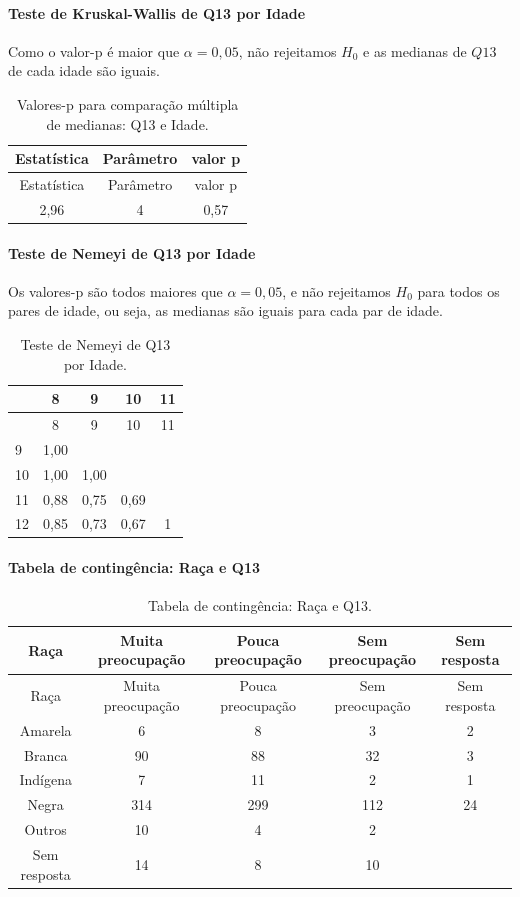 \documentclass[]{article}
\let\oldparagraph\paragraph
\renewcommand{\paragraph}[1]{\oldparagraph{#1}\mbox{}}
\begin{document}
\hypertarget{teste-de-kruskal-wallis-de-q13-por-idade}{%
\paragraph{Teste de Kruskal-Wallis de Q13 por Idade}\label{teste-de-kruskal-wallis-de-q13-por-idade}}

Como o valor-p é maior que \(\alpha=0,05\), não rejeitamos \(H_0\) e as medianas de \(Q13\) de cada idade são iguais.

\begin{longtable}[]{@{}ccc@{}}
\caption{\label{tab:unnamed-chunk-74}Valores-p para comparação múltipla de medianas: Q13 e Idade.}\tabularnewline
\toprule
Estatística & Parâmetro & valor p\tabularnewline
\midrule
\endfirsthead
\toprule
Estatística & Parâmetro & valor p\tabularnewline
\midrule
\endhead
2,96 & 4 & 0,57\tabularnewline
\bottomrule
\end{longtable}

\hypertarget{teste-de-nemeyi-de-q13-por-idade}{%
\paragraph{Teste de Nemeyi de Q13 por Idade}\label{teste-de-nemeyi-de-q13-por-idade}}

Os valores-p são todos maiores que \(\alpha=0,05\), e não rejeitamos \(H_0\) para todos os pares de idade, ou seja, as medianas são iguais para cada par de idade.

\begin{longtable}[]{@{}lcccc@{}}
\caption{\label{tab:unnamed-chunk-75}Teste de Nemeyi de Q13 por Idade.}\tabularnewline
\toprule
& 8 & 9 & 10 & 11\tabularnewline
\midrule
\endfirsthead
\toprule
& 8 & 9 & 10 & 11\tabularnewline
\midrule
\endhead
9 & 1,00 & & &\tabularnewline
10 & 1,00 & 1,00 & &\tabularnewline
11 & 0,88 & 0,75 & 0,69 &\tabularnewline
12 & 0,85 & 0,73 & 0,67 & 1\tabularnewline
\bottomrule
\end{longtable}

\cleardoublepage

\hypertarget{tabela-de-continguxeancia-rauxe7a-e-q13}{%
\paragraph{Tabela de contingência: Raça e Q13}\label{tabela-de-continguxeancia-rauxe7a-e-q13}}

\begin{longtable}[]{@{}ccccc@{}}
\caption{\label{tab:unnamed-chunk-76}Tabela de contingência: Raça e Q13.}\tabularnewline
\toprule
Raça & Muita preocupação & Pouca preocupação & Sem preocupação & Sem resposta\tabularnewline
\midrule
\endfirsthead
\toprule
Raça & Muita preocupação & Pouca preocupação & Sem preocupação & Sem resposta\tabularnewline
\midrule
\endhead
Amarela & 6 & 8 & 3 & 2\tabularnewline
Branca & 90 & 88 & 32 & 3\tabularnewline
Indígena & 7 & 11 & 2 & 1\tabularnewline
Negra & 314 & 299 & 112 & 24\tabularnewline
Outros & 10 & 4 & 2 &\tabularnewline
Sem resposta & 14 & 8 & 10 &\tabularnewline
\bottomrule
\end{longtable}
\end{document}

